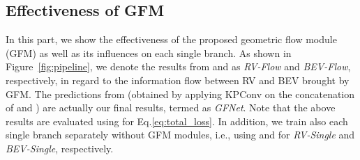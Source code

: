 \subsection{Effectiveness of GFM}

In this part, we show the effectiveness of the proposed geometric flow module (GFM) as well as its influences on each single branch. As shown in Figure~\ref{fig:pipeline}, we denote the results from  and  as \textit{RV-Flow} and \textit{BEV-Flow}, respectively, in regard to the information flow between RV and BEV brought by GFM. The predictions from  (obtained by applying KPConv on the concatenation of  and ) are actually our final results, termed as \textit{GFNet}. Note that the above results are evaluated using  for Eq.\ref{eq:total_loss}. In addition, we train also each single branch separately without GFM modules, i.e., using  and  for \textit{RV-Single} and \textit{BEV-Single}, respectively.

\begin{table*}[b]
\centering
\caption{Quantitative comparisons in terms of mIoU to demonstrate the effectiveness of GFM on the validation set of SemanticKITTI.} 
\vspace{1mm}
\label{tab:gfm}
\end{table*}

